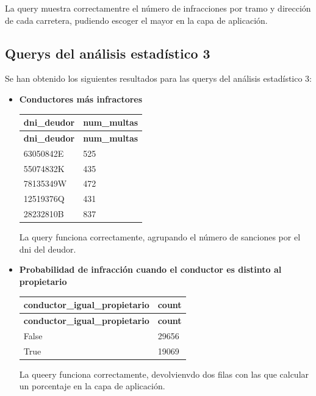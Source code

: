 \documentclass[]{article}
\begin{document}
\begin{itemize}
\begin{table}[H]
\begin{longtable}{l l l l}
\end{longtable}
\end{table}

La query muestra correctamentre el número de infracciones por tramo y dirección de cada carretera, pudiendo escoger el mayor en la capa de aplicación.

\end{itemize}

\subsection{Querys del análisis estadístico 3}
Se han obtenido los siguientes resultados para las querys del análisis estadístico 3:

\begin{itemize}
    \item \textbf{Conductores más infractores}

\begin{table}[H]
\begin{longtable}{l l}
    \hline
    \textbf{dni\_deudor} & \textbf{num\_multas} \\ \hline
    \endfirsthead
    
    \hline
    \textbf{dni\_deudor} & \textbf{num\_multas} \\ \hline
    \endhead
    
    63050842E & 525 \\ \hline
    55074832K & 435 \\ \hline
    78135349W & 472 \\ \hline
    12519376Q & 431 \\ \hline
    28232810B & 837 \\ \hline
    
\end{longtable}
\end{table}

La query funciona correctamente, agrupando el número de sanciones por el dni del deudor.

    \item \textbf{Probabilidad de infracción cuando el conductor es distinto al propietario}

\begin{table}[H]
\begin{longtable}{l l}
    \hline
    \textbf{conductor\_igual\_propietario} & \textbf{count} \\ \hline
    \endfirsthead
    
    \hline
    \textbf{conductor\_igual\_propietario} & \textbf{count} \\ \hline
    \endhead
    
    False & 29656 \\ \hline
    True & 19069 \\ \hline
    
\end{longtable}
\end{table}

La queery funciona correctamente, devolvienvdo dos filas con las que calcular un porcentaje en la capa de aplicación.

\end{itemize}
\end{document}

